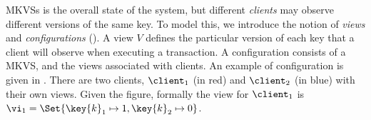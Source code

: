 
MKVSs is the overall state of the system, but different \emph{clients} may observe different versions of the same key. 
To model this, we introduce the notion of \emph{views} and \emph{configurations} (). 
A view $V$ defines the particular version of each key that a client will observe when executing a transaction. 
A configuration consists of a MKVS, and the views associated with clients.
An example of configuration is given in . 
There are two clients, $\client_1$ (in red) and $\client_2$ (in blue) with their own views.
Given the figure, formally the view for \( \client_1 \) is $\vi_1 = \Set{\key{k}_1 \mapsto 1, \key{k}_2 \mapsto 0}$.

